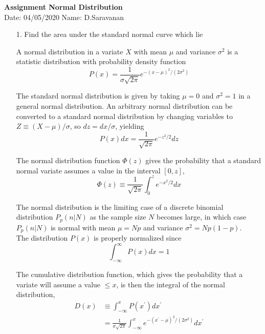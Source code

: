 \documentclass[a4paper,10pt,openright]{report}
\begin{document}
\singlespacing
\pagestyle{plain}

\begin{center}
\textbf{Assignment Normal Distribution} \\
Date: 04/05/2020 \hspace{2mm} Name: D.Saravanan
\end{center}

\vspace{10px}

\begin{enumerate}

\item[1.] Find the area under the standard normal curve which lie 

A normal distribution in a variate $X$ with mean $\mu$ and variance $\sigma^{2}$ is
a statistic distribution with probability density function 
\begin{equation*}
P(x) = \frac{1}{\sigma \sqrt{2\pi}} e^{-(x-\mu)^{2}/(2\sigma^{2})} 
\end{equation*}

The standard normal distribution is given by taking $\mu = 0$ and $\sigma^{2} = 1$ in 
a general normal distribution. An arbitrary normal distribution can be converted to a
standard normal distribution by changing variables to $Z \equiv (X-\mu)/\sigma$, so
$dz = dx/\sigma$, yielding
\begin{equation*}
P(x) dx = \frac{1}{\sqrt{2\pi}} e^{-z^{2}/2} dz
\end{equation*}

The normal distribution function $\Phi(z)$ gives the probability that a standard normal
variate assumes a value in the interval $[0,z]$,
\begin{equation*}
\Phi(z) \equiv \frac{1}{\sqrt{2\pi}} \int_{0}^{z} e^{-x^{2}/2} dx
\end{equation*}

The normal distribution is the limiting case of a discrete binomial distribution
$P_{p}(n|N)$ as the sample size $N$ becomes large, in which case $P_{p}(n|N)$ is normal with
mean $\mu = N p$ and variance $\sigma^{2} = N p(1-p)$. \\

The distribution $P(x)$ is properly normalized since 
\begin{equation*}
\int_{-\infty}^{\infty} P(x) dx = 1
\end{equation*}

The cumulative distribution function, which gives the probability that a variate will assume
a value $\leq x$, is then the integral of the normal distribution,
\begin{equation*}
\begin{split}
D(x) & \equiv \int_{-\infty}^{x} P(x^{'}) dx^{'} \\
		& = \frac{1}{\sigma\sqrt{2\pi}} \int_{-\infty}^{x} e^{-(x^{'}-\mu)^{2}/(2\sigma^{2})} dx^{'}
\end{split}
\end{equation*}


\end{enumerate}
\end{document}
